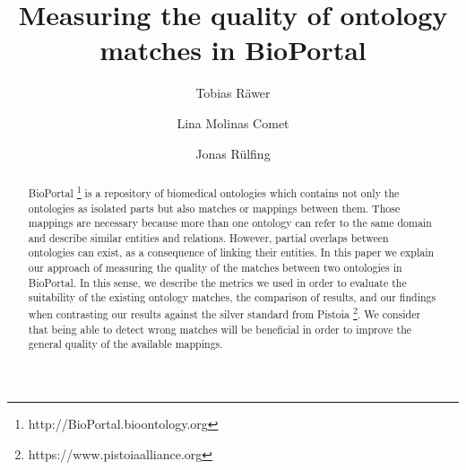 \documentclass[runningheads]{llncs}
\begin{document}
%
\title{Measuring the quality of ontology matches in BioPortal}
%
%
\author{Tobias R\"awer \and
Lina Molinas Comet \and
Jonas R\"ulfing}
%
%
%
\maketitle              %
%
\begin{abstract} \label{abstract}
BioPortal \footnote{http://BioPortal.bioontology.org} is a repository of biomedical ontologies which contains not only the ontologies as isolated parts but also matches or mappings between them. Those mappings are necessary because more than one ontology can refer to the same domain and describe similar entities and relations. However, partial overlaps between ontologies can exist, as a consequence of linking their entities.
In this paper we explain our approach of measuring the quality of the matches between two ontologies in BioPortal. In this sense, we describe the metrics we used in order to evaluate the suitability of the existing ontology matches, the comparison of results, and our findings when contrasting our results against the silver standard from Pistoia \footnote{https://www.pistoiaalliance.org}. We consider that being able to detect wrong matches will be beneficial in order to improve the general quality of the available mappings.

\end{abstract}
%
%
%
\end{document}
